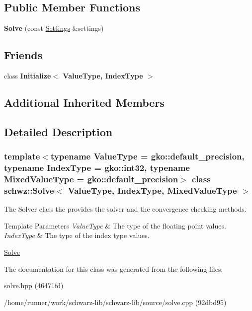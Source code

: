 \subsection*{Public Member Functions}
\begin{DoxyCompactItemize}
\item 
\mbox{\label{classschwz_1_1Solve_a667e6b9674ec54bb95152c8f263f1467}} 
{\bfseries Solve} (const \hyperlink{structschwz_1_1Settings}{Settings} \&settings)
\end{DoxyCompactItemize}
\subsection*{Friends}
\begin{DoxyCompactItemize}
\item 
\mbox{\label{classschwz_1_1Solve_a7044b349fe5363eeace2d1a56b38f650}} 
class {\bfseries Initialize$<$ Value\+Type, Index\+Type $>$}
\end{DoxyCompactItemize}
\subsection*{Additional Inherited Members}


\subsection{Detailed Description}
\subsubsection*{template$<$typename Value\+Type = gko\+::default\+\_\+precision, typename Index\+Type = gko\+::int32, typename Mixed\+Value\+Type = gko\+::default\+\_\+precision$>$\newline
class schwz\+::\+Solve$<$ Value\+Type, Index\+Type, Mixed\+Value\+Type $>$}

The Solver class the provides the solver and the convergence checking methods. 


\begin{DoxyTemplParams}{Template Parameters}
{\em Value\+Type} & The type of the floating point values. \\
\hline
{\em Index\+Type} & The type of the index type values.\\
\hline
\end{DoxyTemplParams}
\hyperlink{group__solve}{Solve} 

The documentation for this class was generated from the following files\+:\begin{DoxyCompactItemize}
\item 
solve.\+hpp (46471fd)\item 
/home/runner/work/schwarz-\/lib/schwarz-\/lib/source/solve.\+cpp (92dbd95)\end{DoxyCompactItemize}
